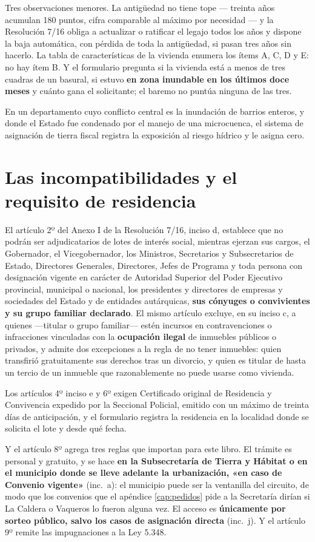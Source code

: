 Tres observaciones menores. La antigüedad no tiene tope --- treinta años acumulan 180 puntos, cifra comparable al máximo por necesidad --- y la Resolución 7/16 obliga a actualizar o ratificar el legajo todos los años y dispone la baja automática, con pérdida de toda la antigüedad, si pasan tres años sin hacerlo. La tabla de características de la vivienda enumera los ítems A, C, D y E: no hay ítem B. Y el formulario pregunta si la vivienda está a menos de tres cuadras de un basural, si estuvo \textbf{en zona inundable en los últimos doce meses} y cuánto gana el solicitante; el baremo no puntúa ninguna de las tres.

En un departamento cuyo conflicto central es la inundación de barrios enteros, y donde el Estado fue condenado por el manejo de una microcuenca, el sistema de asignación de tierra fiscal registra la exposición al riesgo hídrico y le asigna cero.

\section{Las incompatibilidades y el requisito de residencia}

El artículo 2º del Anexo I de la Resolución 7/16, inciso d, establece que no podrán ser adjudicatarios de lotes de interés social, mientras ejerzan sus cargos, el Gobernador, el Vicegobernador, los Ministros, Secretarios y Subsecretarios de Estado, Directores Generales, Directores, Jefes de Programa y toda persona con designación vigente en carácter de Autoridad Superior del Poder Ejecutivo provincial, municipal o nacional, los presidentes y directores de empresas y sociedades del Estado y de entidades autárquicas, \textbf{sus cónyuges o convivientes y su grupo familiar declarado}. El mismo artículo excluye, en su inciso c, a quienes ---titular o grupo familiar--- estén incursos en contravenciones o infracciones vinculadas con la \textbf{ocupación ilegal} de inmuebles públicos o privados, y admite dos excepciones a la regla de no tener inmuebles: quien transfirió gratuitamente sus derechos tras un divorcio, y quien es titular de hasta un tercio de un inmueble que razonablemente no puede usarse como vivienda.

Los artículos 4º inciso e y 6º exigen Certificado original de Residencia y Convivencia expedido por la Seccional Policial, emitido con un máximo de treinta días de anticipación, y el formulario registra la residencia en la localidad donde se solicita el lote y desde qué fecha.

Y el artículo 8º agrega tres reglas que importan para este libro. El trámite es personal y gratuito, y se hace \textbf{en la Subsecretaría de Tierra y Hábitat o en el municipio donde se lleve adelante la urbanización, «en caso de Convenio vigente»} (inc.\ a): el municipio puede ser la ventanilla del circuito, de modo que los convenios que el apéndice \ref{cap:pedidos} pide a la Secretaría dirían si La Caldera o Vaqueros lo fueron alguna vez. El acceso es \textbf{únicamente por sorteo público, salvo los casos de asignación directa} (inc.\ j). Y el artículo 9º remite las impugnaciones a la Ley 5.348.

